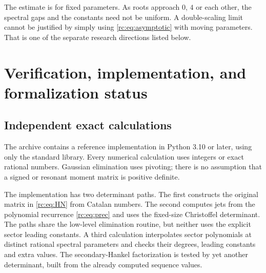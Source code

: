 \documentclass[11pt,a4paper]{article}
\numberwithin{equation}{section}
\theoremstyle{definition}
\theoremstyle{remark}
\begin{document}
The estimate is for fixed parameters.  As roots approach $0$, $4$ or
each other, the spectral gaps and the constants need not be uniform.
A double-scaling limit cannot be justified by simply using
\eqref{rc:eq:asymptotic} with moving parameters.  That is one of the
separate research directions listed below.



\section{Verification, implementation, and formalization status}
\label{rc:sec:verification}

\subsection{Independent exact calculations}
The archive contains a reference implementation in Python 3.10 or later,
using only the standard library.  Every numerical calculation uses
integers or exact rational numbers.  Gaussian elimination uses pivoting;
there is no assumption that a signed or resonant moment matrix is
positive definite.

The implementation has two determinant paths.  The first constructs the
original matrix in \eqref{rc:eq:HN} from Catalan numbers.  The second
computes jets from the polynomial recurrence \eqref{rc:eq:prec} and uses
the fixed-size Christoffel determinant.  The paths share the low-level elimination routine, but neither uses the
explicit sector leading constants.  A third calculation interpolates sector
polynomials at distinct rational spectral parameters and checks their
degrees, leading constants and extra values.  The secondary-Hankel
factorization is tested by yet another determinant, built from the
already computed sequence values.
\end{document}
